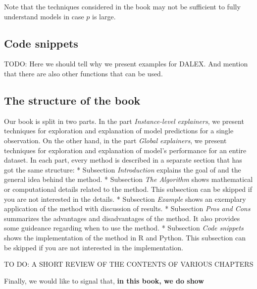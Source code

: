 \documentclass[12pt,]{krantz}
\theoremstyle{definition}
\theoremstyle{definition}
\theoremstyle{definition}
\theoremstyle{remark}
\begin{document}
Note that the techniques considered in the book may not be sufficient to
fully understand models in case \(p\) is large.

\hypertarget{code-snippets}{%
\subsection{Code snippets}\label{code-snippets}}

TODO: Here we should tell why we present examples for DALEX. And mention
that there are also other functions that can be used.

\hypertarget{the-structure-of-the-book}{%
\subsection{The structure of the book}\label{the-structure-of-the-book}}

Our book is split in two parts. In the part \emph{Instance-level
explainers}, we present techniques for exploration and explanation of
model predictions for a single observation. On the other hand, in the
part \emph{Global explainers}, we present techniques for exploration and
explanation of model's performance for an entire dataset. In each part,
every method is described in a separate section that has got the same
structure: * Subsection \emph{Introduction} explains the goal of and the
general idea behind the method. * Subsection \emph{The Algorithm} shows
mathematical or computational details related to the method. This
subsection can be skipped if you are not interested in the details. *
Subsection \emph{Example} shows an exemplary application of the method
with discussion of results. * Subsection \emph{Pros and Cons} summarizes
the advantages and disadvantages of the method. It also provides some
guideance regarding when to use the method. * Subsection \emph{Code
snippets} shows the implementation of the method in R and Python. This
subsection can be skipped if you are not interested in the
implementation.

TO DO: A SHORT REVIEW OF THE CONTENTS OF VARIOUS CHAPTERS

Finally, we would like to signal that, \textbf{in this book, we do show}
\end{document}
